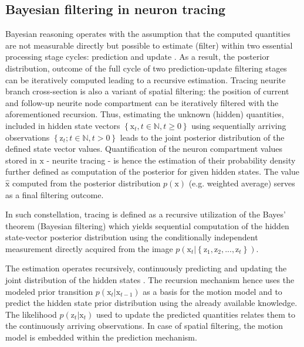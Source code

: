 
\subsection{Bayesian filtering in neuron tracing}
Bayesian reasoning operates with the assumption that the computed quantities are not measurable directly but possible to estimate (filter) within two essential processing stage cycles: prediction and update \cite{doucet2001introduction}. As a result, the posterior distribution, outcome of the full cycle of two prediction-update filtering stages can be iteratively computed leading to a recursive estimation. Tracing neurite branch cross-section is also a variant of spatial filtering: the position of current and follow-up neurite node compartment can be iteratively filtered with the aforementioned recursion. Thus, estimating the unknown (hidden) quantities, included in hidden state vectors $ \left\lbrace \mathrm{x}_t, t \in \mathbb{N},  t \geq 0 \right\rbrace $ using sequentially arriving observations $ \left\lbrace \mathrm{z}_t; t \in \mathbb{N}, t > 0 \right\rbrace $ leads to the joint posterior distribution of the defined state vector values. Quantification of the neuron compartment values stored in $\mathrm{x}$ - neurite tracing - is hence the estimation of their probability density further defined as computation of the posterior for given hidden states. The value $\hat{\mathrm{x}}$ computed from the posterior distribution $p(\mathrm{x})$ (e.g. weighted average) serves as a final filtering outcome.

In such constellation, tracing is defined as a recursive utilization of the Bayes' theorem (Bayesian filtering) which yields sequential computation of the hidden state-vector posterior distribution using the conditionally independent measurement directly acquired from the image $ p(\mathrm{x}_t |  \left\lbrace  \mathrm{z}_1, \mathrm{z}_2, ..., \mathrm{z}_t \right\rbrace  ) $.

The estimation operates recursively, continuously predicting and updating the joint distribution of the hidden states \cite{doucet2001introduction}. The recursion mechanism hence uses the modeled prior transition $ p(\mathrm{x}_t | \mathrm{x}_{t-1}) $ as a basis for the motion model and to predict the hidden state prior distribution using the already available knowledge. The likelihood $ p(\mathrm{z}_t | \mathrm{x}_t) $ used to update the predicted quantities relates them to the continuously arriving observations. In case of spatial filtering, the motion model is embedded within the prediction mechanism.

